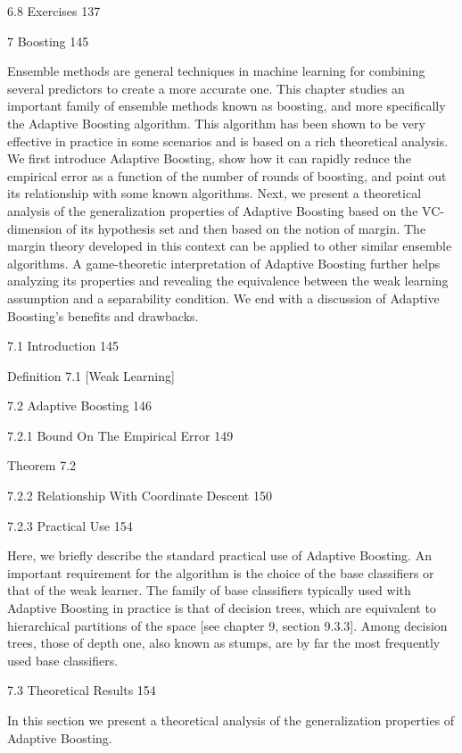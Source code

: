 6.8 Exercises 137



7 Boosting 145

Ensemble methods are general techniques in machine learning for combining several predictors to create a more accurate one. This chapter studies an important family of ensemble methods known as boosting, and more specifically the Adaptive Boosting algorithm. This algorithm has been shown to be very effective in practice in some scenarios and is based on a rich theoretical analysis. We first introduce Adaptive Boosting, show how it can rapidly reduce the empirical error as a function of the number of rounds of boosting, and point out its relationship with some known algorithms. Next, we present a theoretical analysis of the generalization properties of Adaptive Boosting based on the VC-dimension of its hypothesis set and then based on the notion of margin. The margin theory developed in this context can be applied to other similar ensemble algorithms. A game-theoretic interpretation of Adaptive Boosting further helps analyzing its properties and revealing the equivalence between the weak learning assumption and a separability condition. We end with a discussion of Adaptive Boosting's benefits and drawbacks.

7.1 Introduction 145

Definition 7.1 [Weak Learning]

7.2 Adaptive Boosting 146



7.2.1 Bound On The Empirical Error 149

Theorem 7.2

7.2.2 Relationship With Coordinate Descent 150



7.2.3 Practical Use 154

Here, we briefly describe the standard practical use of Adaptive Boosting. An important requirement for the algorithm is the choice of the base classifiers or that of the weak learner. The family of base classifiers typically used with Adaptive Boosting in practice is that of decision trees, which are equivalent to hierarchical partitions of the space [see chapter 9, section 9.3.3]. Among decision trees, those of depth one, also known as stumps, are by far the most frequently used base classifiers.

7.3 Theoretical Results 154

In this section we present a theoretical analysis of the generalization properties of Adaptive Boosting.

